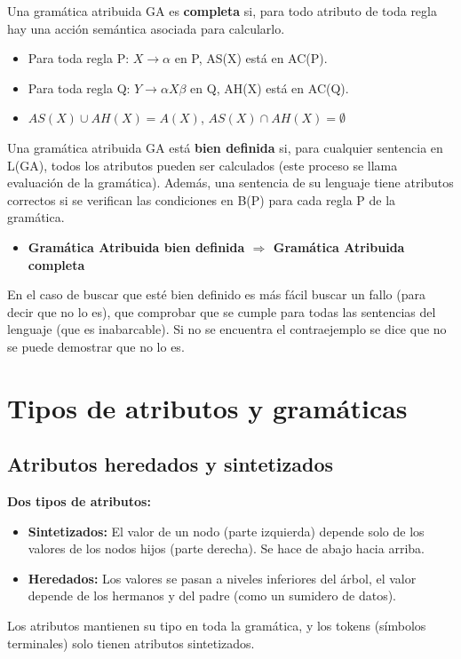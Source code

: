 \documentclass[12pt, twoside, openright]{report} %
\begin{document}
Una gramática atribuida GA es \textbf{completa} si, para todo atributo de toda regla hay una acción semántica asociada para calcularlo.
\begin{itemize}
	\item Para toda regla P: $X\rightarrow\alpha$ en P, AS(X) está en AC(P).
	\item Para toda regla Q: $Y\rightarrow\alpha X \beta$ en Q, AH(X) está en AC(Q).
	\item $AS(X) \cup AH(X) = A(X)$, $AS(X) \cap AH(X)=\emptyset$
\end{itemize}

Una gramática atribuida GA está \textbf{bien definida} si, para cualquier sentencia en L(GA), todos los atributos pueden ser calculados (este proceso se llama evaluación de la gramática). Además, una sentencia de su lenguaje tiene atributos correctos si se verifican las condiciones en B(P) para cada regla P de la gramática.
\begin{itemize}
	\item \textbf{Gramática Atribuida bien definida $\Rightarrow$ Gramática Atribuida completa}
\end{itemize}
En el caso de buscar que esté bien definido es más fácil buscar un fallo (para decir que no lo es), que comprobar que se cumple para todas las sentencias del lenguaje (que es inabarcable). Si no se encuentra el contraejemplo se dice que no se puede demostrar que no lo es.

\section{Tipos de atributos y gramáticas}
\subsection{Atributos heredados y sintetizados}
\begin{figure}[H]
	{\def\svgwidth{.9\textwidth}
		}
\end{figure}
\textbf{Dos tipos de atributos:}
\begin{itemize}
	\item \textbf{Sintetizados:} El valor de un nodo (parte izquierda) depende solo de los valores de los nodos hijos (parte derecha). Se hace de abajo hacia arriba.
	\item \textbf{Heredados:} Los valores se pasan a niveles inferiores del árbol, el valor depende de los hermanos y del padre (como un sumidero de datos).

\end{itemize}
Los atributos mantienen su tipo en toda la gramática, y los tokens (símbolos terminales) solo tienen atributos sintetizados.
\end{document}
